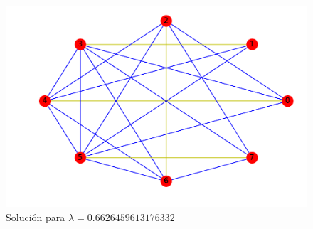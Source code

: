 \documentclass[twoside,a4paper,openright,12pt,tikz]{book}
\begin{document}
\begin{figure}[h!]
\centering
\includegraphics[scale=0.5]{opt4}
\caption{Solución para $\lambda=0.6626459613176332$}
\end{figure}
\end{document}
